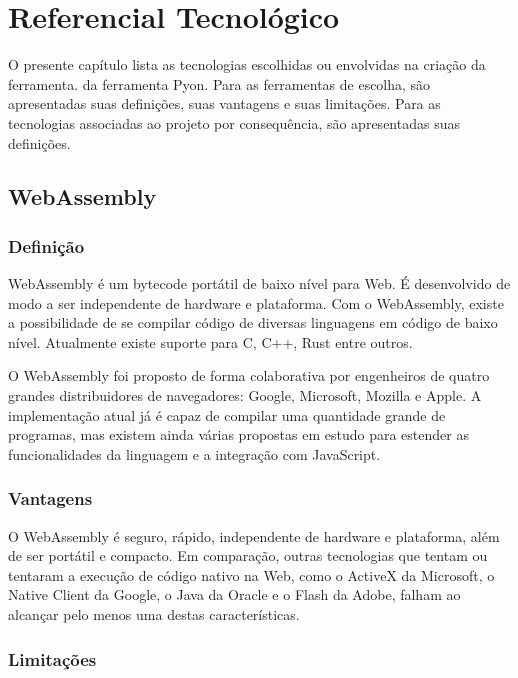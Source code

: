 \chapter*[Referencial Tecnológico]{Referencial Tecnológico}

O presente capítulo lista as tecnologias escolhidas ou envolvidas na criação da ferramenta.
da ferramenta Pyon. Para as ferramentas de escolha, são apresentadas suas definições, suas vantagens e 
suas limitações. Para as tecnologias associadas ao projeto por consequência, são apresentadas suas
definições.

\section{WebAssembly}

\subsection{Definição}

WebAssembly é um bytecode portátil de baixo nível para Web. É desenvolvido de modo a ser independente de hardware e plataforma. Com o WebAssembly, existe a possibilidade de se compilar código de diversas linguagens em código de baixo nível. Atualmente existe suporte para C, C++, Rust entre outros.

O WebAssembly foi proposto de forma colaborativa por engenheiros de quatro grandes distribuidores de navegadores: Google, Microsoft, Mozilla e Apple. A implementação atual já é capaz de compilar uma quantidade grande de programas, mas existem ainda várias propostas em estudo para estender as funcionalidades da linguagem e a integração com JavaScript.

\subsection{Vantagens}

O WebAssembly é seguro, rápido, independente de hardware e plataforma, além de ser portátil e compacto. Em comparação, outras tecnologias que tentam ou tentaram a execução de código nativo na Web, como o ActiveX da Microsoft, o Native Client da Google, o Java da Oracle e o Flash da Adobe, falham ao alcançar pelo menos uma destas características.

\subsection{Limitações}

